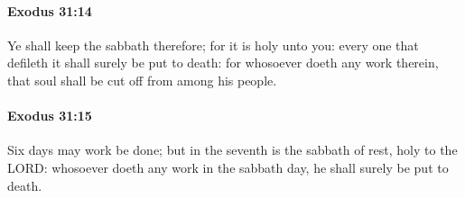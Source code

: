 		\paragraph{Exodus 31:14} %
			\label{EXODUS-31-14}

			Ye shall keep the sabbath therefore; for it is holy unto you: every one that defileth it shall surely be put to death: for whosoever doeth any work therein, that soul shall be cut off from among his people.


		\paragraph{Exodus 31:15} %
			\label{EXODUS-31-15}

			Six days may work be done; but in the seventh is the sabbath of rest, holy to the LORD: whosoever doeth any work in the sabbath day, he shall surely be put to death.

